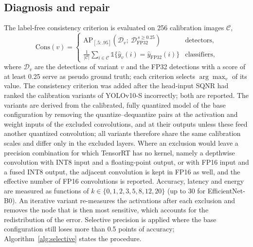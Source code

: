 \documentclass[pdflatex,sn-mathphys-num]{sn-jnl}%
\theoremstyle{thmstyleone}%
\theoremstyle{thmstyletwo}%
\theoremstyle{thmstylethree}%
\begin{document}
\begin{appendices}
\subsection{Diagnosis and repair}\label{sec:supp-repair}
The label-free consistency criterion is evaluated on 256 calibration images $\mathcal{C}$,
\begin{equation}
\mathrm{Cons}(v)=\begin{cases}\mathrm{AP}_{[.5:.95]}\!\left(\mathcal{D}_v;\ \mathcal{D}_\mathrm{FP32}^{\,s\geq0.25}\right) & \text{detectors,}\\[2pt] \frac{1}{|\mathcal{C}|}\sum_{i\in\mathcal{C}}\mathbb{1}\{\hat y_v(i)=\hat y_\mathrm{FP32}(i)\} & \text{classifiers,}\end{cases}\label{eq:consistency}
\end{equation}
where $\mathcal{D}_v$ are the detections of variant $v$ and the FP32 detections with a score of at least 0.25 serve as pseudo ground truth; each criterion selects $\arg\max_v$ of its value. The consistency criterion was added after the head-input SQNR had ranked the calibration variants of YOLOv10-S incorrectly; both are reported. The variants are derived from the calibrated, fully quantized model of the base configuration by removing the quantize--dequantize pairs at the activation and weight inputs of the excluded convolutions, and at their outputs unless these feed another quantized convolution; all variants therefore share the same calibration scales and differ only in the excluded layers. Where an exclusion would leave a precision combination for which TensorRT has no kernel, namely a depthwise convolution with INT8 input and a floating-point output, or with FP16 input and a fused INT8 output, the adjacent convolution is kept in FP16 as well, and the effective number of FP16 convolutions is reported. Accuracy, latency and energy are measured as functions of $k\in\{0,1,2,3,5,8,12,20\}$ (up to 30 for EfficientNet-B0). An iterative variant re-measures the activations after each exclusion and removes the node that is then most sensitive, which accounts for the redistribution of the error. Selective precision is applied where the base configuration still loses more than 0.5 points of accuracy; Algorithm~\ref{alg:selective} states the procedure.


\end{appendices}
\end{document}
